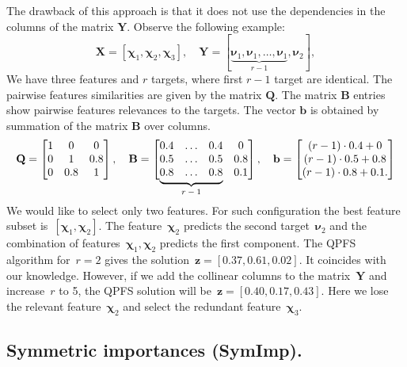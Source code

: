 \documentclass[12pt,oneside]{article}
\theoremstyle{definition}
\newcommand{\bz}{\mathbf{z}}
\newcommand{\bb}{\mathbf{b}}
\newcommand{\bY}{\mathbf{Y}}
\newcommand{\bX}{\mathbf{X}}
\newcommand{\bB}{\mathbf{B}}
\newcommand{\bQ}{\mathbf{Q}}
\newcommand{\bchi}{\boldsymbol{\chi}}
\newcommand{\bnu}{\boldsymbol{\nu}}
\newcommand\undermat[2]{%
	\makebox[0pt][l]{$\smash{\underbrace{\phantom{%
					\begin{matrix}#2\end{matrix}}}_{\text{$#1$}}}$}#2}
\begin{document}
The drawback of this approach is that it does not use the dependencies in the columns of the matrix $\bY$. Observe the following example:
\begin{equation}
	\bX = [\bchi_1, \bchi_2, \bchi_3], \quad \bY = [\underbrace{\bnu_1, \bnu_1, \dots, \bnu_1}_{r-1}, \bnu_2],
\end{equation}
We have three features and $r$ targets, where first $r-1$ target are identical.
The pairwise features similarities are given by the matrix $\bQ$.
The matrix $\bB$ entries show pairwise features relevances to the targets.
The vector $\bb$ is obtained by summation of the matrix $\bB$ over columns.
\begin{equation}
	\bQ = \begin{bmatrix} 1 & 0 & 0\\ 0 & 1 & 0.8 \\ 0 & 0.8 & 1 \end{bmatrix}, \quad
	\bB = \begin{bmatrix} 0.4 & \dots & 0.4 & 0 \\ 0.5 & \dots & 0.5 & 0.8 \\ \undermat{r-1}{0.8 & \dots & 0.8} & 0.1 \end{bmatrix}, \quad
	\bb = \begin{bmatrix} (r-1) \cdot 0.4 + 0 \\ (r-1) \cdot 0.5 + 0.8 \\ (r-1) \cdot 0.8 + 0.1. \end{bmatrix}
	\label{eq:qpfs_example}
\end{equation}
	\vspace{0.5cm} \\
We would like to select only two features.
For such configuration the best feature subset is~$[\bchi_1, \bchi_2]$.
The feature~$\bchi_2$ predicts the second target~$\bnu_2$ and the combination of features~$\bchi_1, \bchi_2$ predicts the first component.
The QPFS algorithm for~$r=2$ gives the solution~$\bz = [0.37,	0.61,	0.02]$. It coincides with our knowledge.
However, if we add the collinear columns to the matrix~$\bY$ and increase~$r$ to 5, the QPFS solution will be~$\bz = [0.40,	0.17, 0.43]$.
Here we lose the relevant feature~$\bchi_2$ and select the redundant feature~$\bchi_3$.

\subsection{Symmetric importances (SymImp).}
\end{document}
